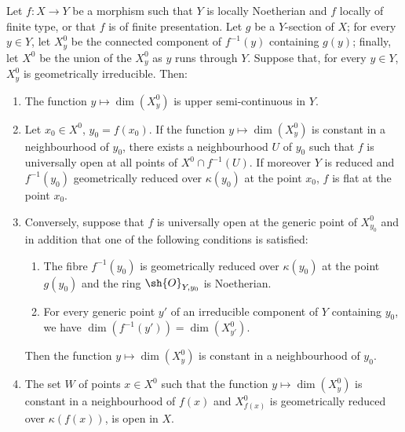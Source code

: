 \begin{proposition}[15.6.6]
\label{IV.15.6.6}
Let $f:X\to Y$ be a morphism such that $Y$ is locally Noetherian and $f$ locally of finite type, or that $f$ is of finite presentation.
Let $g$ be a $Y$-section of $X$; for every $y\in Y$, let $X_y^0$ be the connected component of $f^{-1}(y)$ containing $g(y)$; finally, let $X^0$ be the union of the $X_y^0$ as $y$ runs through $Y$.
Suppose that, for every $y\in Y$, $X_y^0$ is geometrically irreducible.
Then:
\begin{enumerate}[label=(\roman*)]
  \item The function $y\mapsto\dim(X_y^0)$ is upper semi-continuous in $Y$.
  \item Let $x_0\in X^0$, $y_0=f(x_0)$.
If the function $y\mapsto\dim(X_y^0)$ is constant in a neighbourhood of $y_0$, there exists a neighbourhood $U$ of $y_0$ such that $f$ is universally open at all points of $X^0\cap f^{-1}(U)$.
If moreover $Y$ is reduced and $f^{-1}(y_0)$ geometrically reduced over $\kappa(y_0)$ at the point $x_0$, $f$ is flat at the point $x_0$.
  \item Conversely, suppose that $f$ is universally open at the generic point of $X_{y_0}^0$ and in addition that one of the following conditions is satisfied:
  \begin{enumerate}[label=$\alpha$)]
    \item The fibre $f^{-1}(y_0)$ is geometrically reduced over $\kappa(y_0)$ at the point $g(y_0)$ and the ring $\sh{O}_{Y,y_0}$ is Noetherian.
    \item For every generic point $y'$ of an irreducible component of $Y$ containing $y_0$, we have $\dim(f^{-1}(y'))=\dim(X_{y'}^0)$.
  \end{enumerate}
Then the function $y\mapsto\dim(X_y^0)$ is constant in a neighbourhood of $y_0$.
  \item The set $W$ of points $x\in X^0$ such that the function $y\mapsto\dim(X_y^0)$ is constant in a neighbourhood of $f(x)$ and $X_{f(x)}^0$ is geometrically reduced over $\kappa(f(x))$, is open in $X$.
\end{enumerate}
\end{proposition}

